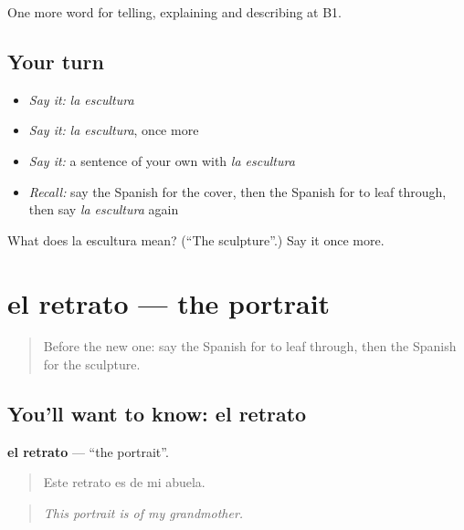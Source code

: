 \begin{grammarlens}[title={What you've built}]
One more word for telling, explaining and describing at B1.
\end{grammarlens}

\subsection*{Your turn}
\begin{itemize}
\raggedright
  \item \emph{Say it:} \emph{la escultura}
  \item \emph{Say it:} \emph{la escultura}, once more
  \item \emph{Say it:} a sentence of your own with \emph{la escultura}
  \item \emph{Recall:} say the Spanish for the cover, then the Spanish for to leaf through, then say \emph{la escultura} again
\end{itemize}

\begin{tcolorbox}[breakable,colback=teal!4,colframe=teal!35!black,title={Before you move on}]
What does la escultura mean? (\textquotedblleft{}The sculpture\textquotedblright{}.) Say it once more.
\end{tcolorbox}
\section[el retrato]{el retrato — the portrait}

\label{lesson:ES-C763-retrato}



\begin{quote}
Before the new one: say the Spanish for to leaf through, then the Spanish for the sculpture.
\end{quote}

\subsection*{You'll want to know: el retrato}
\textbf{el retrato} — \textquotedblleft{}the portrait\textquotedblright{}.

\begin{quote}
Este retrato es de mi abuela.
\end{quote}

\begin{quote}
\emph{This portrait is of my grandmother.}
\end{quote}


